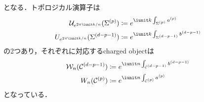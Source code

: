 \documentclass[TQFT_main]{subfiles}
\begin{document}
となる．トポロジカル演算子は
\begin{align}
    \mathcal{U}_{e^{2\pi \iunit k/n}}(\mfd{\Sigma}{p}) &\coloneqq e^{\iunit k \int_{\mfd{\Sigma}{p}} \hg{a}{p}} \\
    U_{e^{2\pi \iunit k/n}}(\mfd{\Sigma}{d-p-1}) &\coloneqq e^{\iunit k \int_{\mfd{\Sigma}{d-p-1}} \hg{b}{d-p-1}}
\end{align}
の2つあり，それぞれに対応するcharged objectは
\begin{align}
    \mathcal{W}_n (\mfdcal{C}{d-p-1}) &\coloneqq e^{\iunit n \int_{\mfdcal{C}{d-p-1}} \hg{b}{d-p-1}} \\
    W_n (\mfdcal{C}{p}) &\coloneqq e^{\iunit n \int_{\mfdcal{C}{p}} \hg{a}{p}}
\end{align}
となっている．


    
\end{document}
